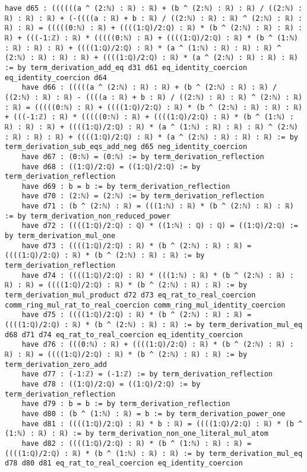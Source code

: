 \documentclass{article}
\begin{document}
\begin{tcolorbox}[colback=white!10, width=\linewidth]
\begin{lstlisting}[language=Lean4]
    have d65 : ((((((a ^ (2:ℕ) : ℝ) : ℝ) + (b ^ (2:ℕ) : ℝ) : ℝ) / ((2:ℕ) : ℝ) : ℝ) : ℝ) + (-((((a : ℝ) + b : ℝ) / ((2:ℕ) : ℝ) : ℝ) ^ (2:ℕ) : ℝ) : ℝ) : ℝ) = (((((0:ℕ) : ℝ) + ((((1:ℚ)/2:ℚ) : ℝ) * (b ^ (2:ℕ) : ℝ) : ℝ) : ℝ) + (((-1:ℤ) : ℝ) * (((((0:ℕ) : ℝ) + ((((1:ℚ)/2:ℚ) : ℝ) * (b ^ (1:ℕ) : ℝ) : ℝ) : ℝ) + ((((1:ℚ)/2:ℚ) : ℝ) * (a ^ (1:ℕ) : ℝ) : ℝ) : ℝ) ^ (2:ℕ) : ℝ) : ℝ) : ℝ) + ((((1:ℚ)/2:ℚ) : ℝ) * (a ^ (2:ℕ) : ℝ) : ℝ) : ℝ) := by term_derivation_add_eq d31 d61 eq_identity_coercion eq_identity_coercion d64
    have d66 : (((((a ^ (2:ℕ) : ℝ) : ℝ) + (b ^ (2:ℕ) : ℝ) : ℝ) / ((2:ℕ) : ℝ) : ℝ) - ((((a : ℝ) + b : ℝ) / ((2:ℕ) : ℝ) : ℝ) ^ (2:ℕ) : ℝ) : ℝ) = (((((0:ℕ) : ℝ) + ((((1:ℚ)/2:ℚ) : ℝ) * (b ^ (2:ℕ) : ℝ) : ℝ) : ℝ) + (((-1:ℤ) : ℝ) * (((((0:ℕ) : ℝ) + ((((1:ℚ)/2:ℚ) : ℝ) * (b ^ (1:ℕ) : ℝ) : ℝ) : ℝ) + ((((1:ℚ)/2:ℚ) : ℝ) * (a ^ (1:ℕ) : ℝ) : ℝ) : ℝ) ^ (2:ℕ) : ℝ) : ℝ) : ℝ) + ((((1:ℚ)/2:ℚ) : ℝ) * (a ^ (2:ℕ) : ℝ) : ℝ) : ℝ) := by term_derivation_sub_eqs_add_neg d65 neg_identity_coercion
    have d67 : (0:ℕ) = (0:ℕ) := by term_derivation_reflection
    have d68 : ((1:ℚ)/2:ℚ) = ((1:ℚ)/2:ℚ) := by term_derivation_reflection
    have d69 : b = b := by term_derivation_reflection
    have d70 : (2:ℕ) = (2:ℕ) := by term_derivation_reflection
    have d71 : (b ^ (2:ℕ) : ℝ) = (((1:ℕ) : ℝ) * (b ^ (2:ℕ) : ℝ) : ℝ) := by term_derivation_non_reduced_power
    have d72 : ((((1:ℚ)/2:ℚ) : ℚ) * ((1:ℕ) : ℚ) : ℚ) = ((1:ℚ)/2:ℚ) := by term_derivation_mul_one
    have d73 : ((((1:ℚ)/2:ℚ) : ℝ) * (b ^ (2:ℕ) : ℝ) : ℝ) = ((((1:ℚ)/2:ℚ) : ℝ) * (b ^ (2:ℕ) : ℝ) : ℝ) := by term_derivation_reflection
    have d74 : ((((1:ℚ)/2:ℚ) : ℝ) * (((1:ℕ) : ℝ) * (b ^ (2:ℕ) : ℝ) : ℝ) : ℝ) = ((((1:ℚ)/2:ℚ) : ℝ) * (b ^ (2:ℕ) : ℝ) : ℝ) := by term_derivation_mul_product d72 d73 eq_rat_to_real_coercion comm_ring_mul_rat_to_real_coercion comm_ring_mul_identity_coercion
    have d75 : ((((1:ℚ)/2:ℚ) : ℝ) * (b ^ (2:ℕ) : ℝ) : ℝ) = ((((1:ℚ)/2:ℚ) : ℝ) * (b ^ (2:ℕ) : ℝ) : ℝ) := by term_derivation_mul_eq d68 d71 d74 eq_rat_to_real_coercion eq_identity_coercion
    have d76 : (((0:ℕ) : ℝ) + ((((1:ℚ)/2:ℚ) : ℝ) * (b ^ (2:ℕ) : ℝ) : ℝ) : ℝ) = ((((1:ℚ)/2:ℚ) : ℝ) * (b ^ (2:ℕ) : ℝ) : ℝ) := by term_derivation_zero_add
    have d77 : (-1:ℤ) = (-1:ℤ) := by term_derivation_reflection
    have d78 : ((1:ℚ)/2:ℚ) = ((1:ℚ)/2:ℚ) := by term_derivation_reflection
    have d79 : b = b := by term_derivation_reflection
    have d80 : (b ^ (1:ℕ) : ℝ) = b := by term_derivation_power_one
    have d81 : ((((1:ℚ)/2:ℚ) : ℝ) * b : ℝ) = ((((1:ℚ)/2:ℚ) : ℝ) * (b ^ (1:ℕ) : ℝ) : ℝ) := by term_derivation_non_one_literal_mul_atom
    have d82 : ((((1:ℚ)/2:ℚ) : ℝ) * (b ^ (1:ℕ) : ℝ) : ℝ) = ((((1:ℚ)/2:ℚ) : ℝ) * (b ^ (1:ℕ) : ℝ) : ℝ) := by term_derivation_mul_eq d78 d80 d81 eq_rat_to_real_coercion eq_identity_coercion

\end{lstlisting}
\end{tcolorbox}
\end{document}
